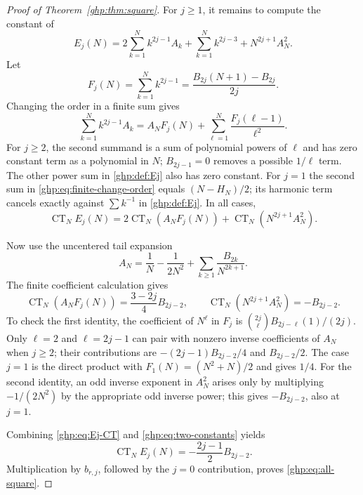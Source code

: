 \begin{proof}[Proof of Theorem~\ref{ghp:thm:square}]
For $j\geq1$, it remains to compute the constant of
\begin{equation}\label{ghp:def:Ej}
 E_j(N)=2\sum_{k=1}^Nk^{2j-1}A_k
        +\sum_{k=1}^Nk^{2j-3}+N^{2j+1}A_N^2.
\end{equation}
Let
\[
 F_j(N)=\sum_{k=1}^Nk^{2j-1}
       =\frac{B_{2j}(N+1)-B_{2j}}{2j}.
\]
Changing the order in a finite sum gives
\begin{equation}\label{ghp:eq:finite-change-order}
 \sum_{k=1}^Nk^{2j-1}A_k
  =A_NF_j(N)+\sum_{\ell=1}^N\frac{F_j(\ell-1)}{\ell^2}.
\end{equation}
For $j\geq2$, the second summand is a sum of polynomial powers of
$\ell$ and has zero constant term as a polynomial in $N$;
$B_{2j-1}=0$ removes a possible $1/\ell$ term. The other power sum in
\eqref{ghp:def:Ej} also has zero constant. For $j=1$ the second sum in
\eqref{ghp:eq:finite-change-order} equals $(N-H_N)/2$; its harmonic
term cancels exactly against $\sum k^{-1}$ in \eqref{ghp:def:Ej}.
In all cases,
\begin{equation}\label{ghp:eq:Ej-CT}
 \operatorname{CT}_NE_j(N)
   =2\operatorname{CT}_N(A_NF_j(N))
          +\operatorname{CT}_N(N^{2j+1}A_N^2).
\end{equation}

Now use the uncentered tail expansion
\[
 A_N=\frac1N-\frac1{2N^2}
                  +\sum_{k\geq1}\frac{B_{2k}}{N^{2k+1}}.
\]
The finite coefficient calculation gives
\begin{equation}\label{ghp:eq:two-constants}
 \operatorname{CT}_N(A_NF_j(N))
      =\frac{3-2j}{4}B_{2j-2},\qquad
 \operatorname{CT}_N(N^{2j+1}A_N^2)=-B_{2j-2}.
\end{equation}
To check the first identity, the coefficient of $N^\ell$ in $F_j$
is $\binom{2j}{\ell}B_{2j-\ell}(1)/(2j)$. Only $\ell=2$ and
$\ell=2j-1$ can pair with nonzero inverse coefficients of $A_N$
when $j\geq2$; their contributions are
$-(2j-1)B_{2j-2}/4$ and $B_{2j-2}/2$. The case $j=1$ is the direct
product with $F_1(N)=(N^2+N)/2$ and gives $1/4$.
For the second identity, an odd inverse exponent in $A_N^2$ arises
only by multiplying $-1/(2N^2)$ by the appropriate odd inverse power;
this gives $-B_{2j-2}$, also at $j=1$.

Combining \eqref{ghp:eq:Ej-CT} and \eqref{ghp:eq:two-constants} yields
\[
 \operatorname{CT}_NE_j(N)=-\frac{2j-1}{2}B_{2j-2}.
\]
Multiplication by $b_{r,j}$, followed by the $j=0$ contribution,
proves \eqref{ghp:eq:all-square}.
\end{proof}

